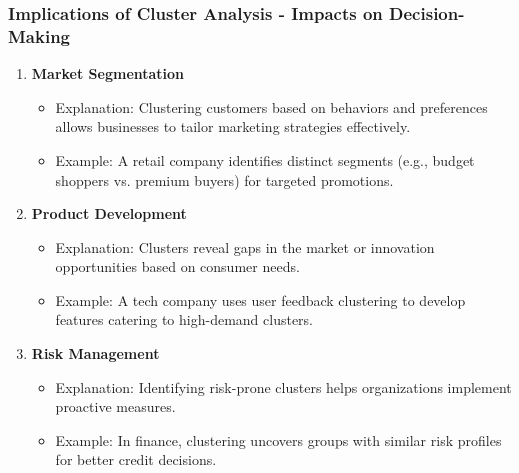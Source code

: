 \documentclass[aspectratio=169]{beamer}
\begin{document}
\begin{frame}[fragile]
    \frametitle{Implications of Cluster Analysis - Impacts on Decision-Making}
    \begin{enumerate}
        \item \textbf{Market Segmentation}
            \begin{itemize}
                \item Explanation: Clustering customers based on behaviors and preferences allows businesses to tailor marketing strategies effectively.
                \item Example: A retail company identifies distinct segments (e.g., budget shoppers vs. premium buyers) for targeted promotions.
            \end{itemize}

        \item \textbf{Product Development}
            \begin{itemize}
                \item Explanation: Clusters reveal gaps in the market or innovation opportunities based on consumer needs.
                \item Example: A tech company uses user feedback clustering to develop features catering to high-demand clusters.
            \end{itemize}

        \item \textbf{Risk Management}
            \begin{itemize}
                \item Explanation: Identifying risk-prone clusters helps organizations implement proactive measures. 
                \item Example: In finance, clustering uncovers groups with similar risk profiles for better credit decisions.
            \end{itemize}
    \end{enumerate}
\end{frame}
\end{document}
